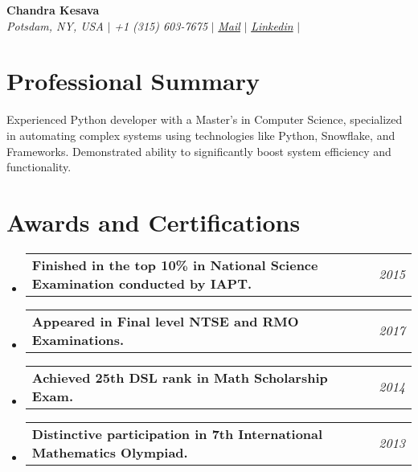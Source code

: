\documentclass[letterpaper,10pt]{article}
\makeatletter
\newcommand{\sectionspace}{
\vspace{-20pt}
}
\newcommand{\subheadingtitlevspace}{
\vspace{-3pt}
}
\newcommand{\titleItem}[1]{
  \textbf{#1}
}
\newcommand{\resumeProjectHeading}[2]{
    \item
    \begin{tabular*}{0.97\textwidth}{l@{\extracolsep{\fill}}r}
      #1 & \textit{ #2} \\
    \end{tabular*}\vspace{-9pt}
}
\newcommand{\resumeSubHeadingListStart}{\subheadingtitlevspace\begin{itemize}[leftmargin=0.15in, label={}]}
\newcommand{\resumeSubHeadingListEnd}{\end{itemize}}
\makeatother
\begin{document}

\begin{flushleft}
    \textbf{\large Chandra Kesava} \\    
    \textit{Potsdam, NY, USA} $|$ 
    \textit{+1 (315) 603-7675} $|$  
    \href{mailto:chandrakesavab3050@gmail.com}{{\textit{Mail}}} $|$ 
    \href{https://www.linkedin.com/in/chandrakesava}{{\textit{Linkedin}}} $|$
    \href{https://github.com/Chandu-3050}{{}}
    \vspace{-8pt}
\end{flushleft}


\section{Professional Summary}
\vspace{-3pt}
\begin{itemize}[leftmargin=0.15in, label={}]
    {\item{
     {Experienced Python developer with a Master’s in Computer Science, specialized in automating complex systems using technologies like Python, Snowflake, and Frameworks. Demonstrated ability to significantly boost system efficiency and functionality.} \\      
    }}
 \end{itemize}
 \sectionspace



\section{Awards and Certifications}
    \resumeSubHeadingListStart
      \resumeProjectHeading
          {\titleItem{Finished in the top 10\% in National Science Examination conducted by IAPT.}}{2015}
      \resumeProjectHeading
          {\titleItem{Appeared in Final level NTSE and RMO Examinations.}}{2017}
      \resumeProjectHeading
          {\titleItem{Achieved 25th DSL rank in Math Scholarship Exam.}}{2014}
       \resumeProjectHeading
          {\titleItem{Distinctive participation in 7th International Mathematics Olympiad.}}{2013}
    \resumeSubHeadingListEnd
\end{document}
